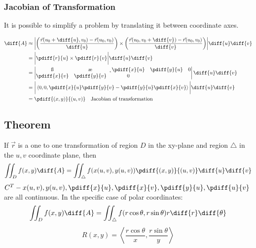 \documentclass{math}
\begin{document}
\subsubsection*{Jacobian of Transformation}
It is possible to simplify a problem by translating it between coordinate axes.
\begin{center}
\end{center}
\begin{align*}
  \diff{A} &\approx \bigg|
    \bigg(\frac{\vec{r}(u_0+\diff{u},v_0)-\vec{r}(u_0,v_0)}{\diff{u}}\bigg)
    \times
    \bigg(\frac{\vec{r}(u_0,v_0+\diff{v})-\vec{r}(u_0,v_0)}{\diff{v}}\bigg)
    \bigg| \diff{u}\diff{v} \\
  &= \bigg|\pdiff{r}{u}\times\pdiff{r}{v}\bigg|\diff{u}\diff{v} \\
  &= \begin{vmatrix}
    \i & \j & \k \\
    \pdiff{x}{u} & \pdiff{y}{u} & 0 \\
    \pdiff{x}{v} & \pdiff{y}{v} & 0
  \end{vmatrix}\diff{u}\diff{v} \\
  &= \bigg|\left\langle
    0,0,\pdiff{x}{u}\pdiff{y}{v}-\pdiff{y}{u}\pdiff{x}{v}\right\rangle\bigg|
    \diff{u}\diff{v} \\
  &= \pdiff{(x,y)}{(u,v)} \quad \text{Jacobian of transformation}
\end{align*}

\subsection*{Theorem}
If \( \vec{r} \) is a one to one transformation of region \( D \) in the
xy-plane and region \( \triangle \) in the \( u,v \) coordinate plane, then
\[ \iint_{D}f(x,y)\diff{A} =
  \iint_{\triangle}f(x(u,v),y(u,v))\pdiff{(x,y)}{(u,v)}\diff{u}\diff{v} \]
\( C^T - x(u,v),y(u,v),\pdiff{x}{u},\pdiff{x}{v},\pdiff{y}{u},\pdiff{u}{v} \)
are all continuous. In the specific case of polar coordinates:
\[ \iint_{D}f(x,y)\diff{A} =
  \iint_{\triangle}f(r\cos\theta,r\sin\theta)r\diff{r}\diff{\theta} \]
\[ R(x,y) = \left\langle
  \frac{r\cos\theta}{x},\frac{r\sin\theta}{y}\right\rangle \]
\end{document}
